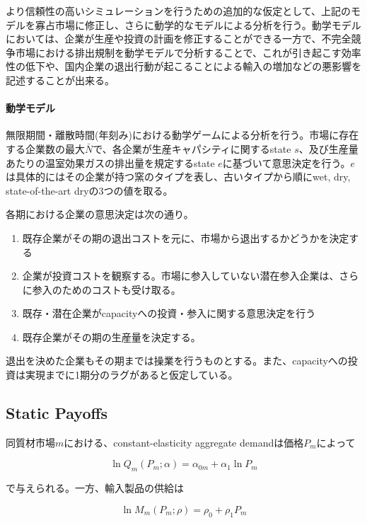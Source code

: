\documentclass[11pt]{jsarticle}
\begin{document}
より信頼性の高いシミュレーションを行うための追加的な仮定として、上記のモデルを寡占市場に修正し、さらに動学的なモデルによる分析を行う。動学モデルにおいては、企業が生産や投資の計画を修正することができる一方で、不完全競争市場における排出規制を動学モデルで分析することで、これが引き起こす効率性の低下や、国内企業の退出行動が起こることによる輸入の増加などの悪影響を記述することが出来る。

\paragraph{動学モデル}

無限期間・離散時間(年刻み)における動学ゲームによる分析を行う。市場に存在する企業数の最大$\bar{N}$で、各企業が生産キャパシティに関するstate $s$、及び生産量あたりの温室効果ガスの排出量を規定するstate $e$に基づいて意思決定を行う。$e$は具体的にはその企業が持つ窯のタイプを表し、古いタイプから順にwet, dry, state-of-the-art dryの3つの値を取る。

各期における企業の意思決定は次の通り。

\begin{enumerate}
  \item 既存企業がその期の退出コストを元に、市場から退出するかどうかを決定する

  \item 企業が投資コストを観察する。市場に参入していない潜在参入企業は、さらに参入のためのコストも受け取る。

  \item 既存・潜在企業がcapacityへの投資・参入に関する意思決定を行う

  \item 既存企業がその期の生産量を決定する。
\end{enumerate}

退出を決めた企業もその期までは操業を行うものとする。また、capacityへの投資は実現までに1期分のラグがあると仮定している。

\subsection{Static Payoffs}

同質材市場$m$における、constant-elasticity aggregate demandは価格$P_m$によって

\[
\ln Q_m (P_m; \alpha) = \alpha_{0m} + \alpha_1 \ln P_m
\]

で与えられる。一方、輸入製品の供給は

\[
\ln M_m (P_m; \rho) = \rho_0 + \rho_1 P_m
\]
\end{document}
